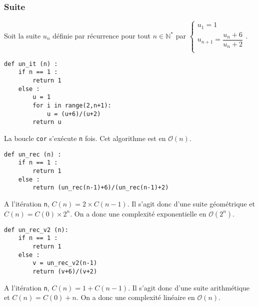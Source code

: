 \subsubsection{Suite}
Soit la suite $u_n$ définie par récurrence pour tout $n\in\mathbb{N}^*$ par 
$
\left\{
\begin{array}{ll} 
u_1 = 1 \\
u_{n+1} = \dfrac{u_n + 6}{u_n + 2} \\
\end{array}
\right.
$.


\noindent\begin{minipage}[t]{.32\linewidth}
\begin{lstlisting}
def un_it (n) :
    if n == 1 :
        return 1
    else : 
        u = 1
        for i in range(2,n+1):
            u = (u+6)/(u+2)
        return u
\end{lstlisting}

La boucle \texttt{cor} s'exécute \texttt{n} fois. Cet algorithme est en $\mathcal{O}(n)$.
\end{minipage} \hfill
\begin{minipage}[t]{.32\linewidth}
\begin{lstlisting}
def un_rec (n) :
    if n == 1 :
        return 1
    else : 
        return (un_rec(n-1)+6)/(un_rec(n-1)+2)
\end{lstlisting}

A l'itération \texttt{n}, $C(n) = 2\times C(n-1)$.  Il s'agit donc d'une suite géométrique et $C(n)=C(0)\times 2^n$.
On a donc une complexité exponentielle en $\mathcal{O}(2^n)$.
\end{minipage} \hfill
\begin{minipage}[t]{.32\linewidth}
\begin{lstlisting}
def un_rec_v2 (n):
    if n == 1 :
        return 1
    else : 
        v = un_rec_v2(n-1)
        return (v+6)/(v+2)
\end{lstlisting}

A l'itération \texttt{n}, $C(n) = 1+C(n-1)$.  Il s'agit donc d'une suite arithmétique et $C(n)=C(0) + n$.
On a donc une complexité linéaire en $\mathcal{O}(n)$.

\end{minipage} 



